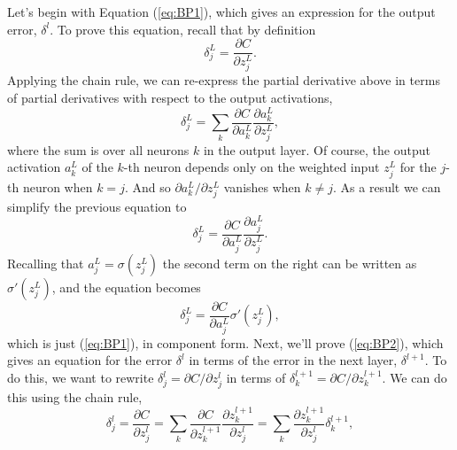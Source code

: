 \documentclass[a4paper,twoside,10pt]{book}
\begin{document}
Let's begin with Equation (\ref{eq:BP1}), which gives an expression for the output error, $\delta^l$. To prove this equation, recall that by definition
\begin{equation}
	\delta^L_j = \frac{\partial C}{\partial z^L_j}.
	\tag{36}\label{eq:36}
\end{equation}
Applying the chain rule, we can re-express the partial derivative above in terms of partial derivatives with respect to the output activations,
\begin{equation}
	\delta^L_j = \sum_k \frac{\partial C}{\partial a^L_k} \frac{\partial a^L_k}{\partial z^L_j},
	\tag{37}\label{eq:37}
\end{equation}%
where the sum is over all neurons $k$ in the output layer. Of course, the output activation $a^L_k$ of the $k$-th neuron depends only on the weighted input $z^L_j$ for the $j$-th neuron when $k=j$. And so $\partial{}a^L_k/\partial{}z^L_j$ vanishes when $k\ne{}j$. As a result we can simplify the previous equation to
\begin{equation}
	\delta^L_j = \frac{\partial C}{\partial a^L_j} \frac{\partial a^L_j}{\partial z^L_j}.
	\tag{38}\label{eq:38}
\end{equation}%
Recalling that $a^L_j=\sigma(z^L_j)$ the second term on the right can be written as $\sigma'(z^L_j)$, and the equation becomes
\begin{equation}
	\delta^L_j = \frac{\partial C}{\partial a^L_j} \sigma'(z^L_j),
	\tag{39}\label{eq:39}
\end{equation}
which is just (\ref{eq:BP1}), in component form.
%
Next, we'll prove (\ref{eq:BP2}), which gives an equation for the error $\delta^l$ in terms of the error in the next layer, $\delta^{l+1}$. To do this, we want to rewrite $\delta^l_j=\partial{}C/\partial{}z^l_j$ in terms of $\delta^{l+1}_k=\partial{}C/\partial{}z^{l+1}_k$. We can do this using the chain rule,
\begin{equation}
\delta^l_j =  \frac{\partial C}{\partial z^l_j} =  \sum_k \frac{\partial C}{\partial z^{l+1}_k} \frac{\partial z^{l+1}_k}{\partial z^l_j} = \sum_k \frac{\partial z^{l+1}_k}{\partial z^l_j} \delta^{l+1}_k,
\tag{42}\label{eq:42}
\end{equation}
\end{document}
